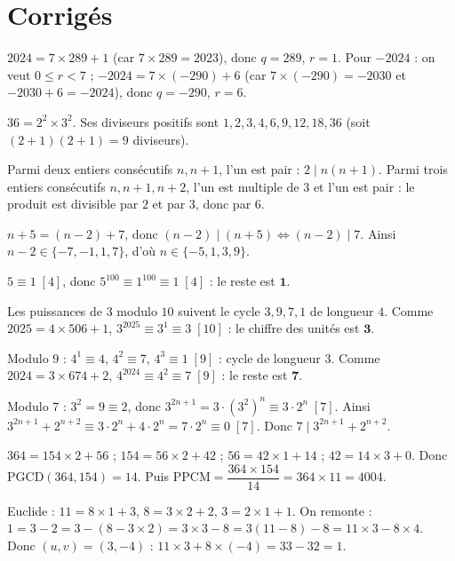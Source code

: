 \section{Corrigés}

$2024=7\times 289+1$ (car $7\times 289=2023$), donc $q=289$, $r=1$. Pour $-2024$ : on veut $0\le r<7$ ; $-2024=7\times(-290)+6$ (car $7\times(-290)=-2030$ et $-2030+6=-2024$), donc $q=-290$, $r=6$.

$36=2^{2}\times 3^{2}$. Ses diviseurs positifs sont $1,2,3,4,6,9,12,18,36$ (soit $(2{+}1)(2{+}1)=9$ diviseurs).

Parmi deux entiers consécutifs $n,n+1$, l'un est pair : $2\mid n(n+1)$. Parmi trois entiers consécutifs $n,n+1,n+2$, l'un est multiple de $3$ et l'un est pair : le produit est divisible par $2$ et par $3$, donc par $6$.

$n+5=(n-2)+7$, donc $(n-2)\mid(n+5)\iff(n-2)\mid 7$. Ainsi $n-2\in\{-7,-1,1,7\}$, d'où $n\in\{-5,1,3,9\}$.

$5\equiv 1\;[4]$, donc $5^{100}\equiv 1^{100}\equiv 1\;[4]$ : le reste est $\mathbf 1$.

Les puissances de $3$ modulo $10$ suivent le cycle $3,9,7,1$ de longueur $4$. Comme $2025=4\times 506+1$, $3^{2025}\equiv 3^{1}\equiv 3\;[10]$ : le chiffre des unités est $\mathbf 3$.

Modulo $9$ : $4^{1}\equiv4$, $4^{2}\equiv7$, $4^{3}\equiv1\;[9]$ : cycle de longueur $3$. Comme $2024=3\times674+2$, $4^{2024}\equiv4^{2}\equiv7\;[9]$ : le reste est $\mathbf 7$.

Modulo $7$ : $3^{2}=9\equiv 2$, donc $3^{2n+1}=3\cdot(3^{2})^{n}\equiv 3\cdot 2^{n}\;[7]$. Ainsi $3^{2n+1}+2^{n+2}\equiv 3\cdot 2^{n}+4\cdot 2^{n}=7\cdot 2^{n}\equiv 0\;[7]$. Donc $7\mid 3^{2n+1}+2^{n+2}$.

$364=154\times2+56$ ; $154=56\times2+42$ ; $56=42\times1+14$ ; $42=14\times3+0$. Donc $\mathrm{PGCD}(364,154)=14$. Puis $\mathrm{PPCM}=\dfrac{364\times154}{14}=364\times11=4004$.

Euclide : $11=8\times1+3$, $8=3\times2+2$, $3=2\times1+1$. On remonte : $1=3-2=3-(8-3\times2)=3\times3-8=3(11-8)-8=11\times3-8\times4$. Donc $(u,v)=(3,-4)$ : $11\times3+8\times(-4)=33-32=1$.

